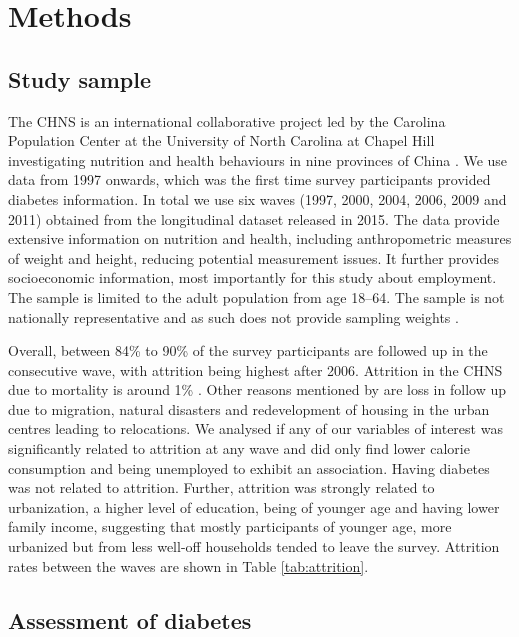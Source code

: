 \section{\label{sec:Methods5}Methods}

\subsection{Study sample}


The \ac{CHNS} is an international collaborative project led by the Carolina Population Center at the University of North Carolina at Chapel Hill investigating nutrition and health behaviours in nine provinces of China \parencite{Zhang2014d}. We use data from 1997 onwards, which was the first time survey participants provided diabetes information. In total we use six waves (1997, 2000, 2004, 2006, 2009 and 2011) obtained from the longitudinal dataset released in 2015. The data provide extensive information on nutrition and health, including anthropometric measures of weight and height, reducing potential measurement issues. It further provides socioeconomic information, most importantly for this study about employment. The sample is limited to the adult population from age 18--64.  The sample is not nationally representative and as such does not provide sampling weights  \parencite{Popkin2010}.

Overall, between 84\% to 90\% of the survey participants are followed up in the consecutive wave, with attrition being highest after 2006. Attrition in the \ac{CHNS} due to mortality is around 1\% \parencite{Popkin2010}. Other reasons mentioned by \textcite{Popkin2010} are loss in follow up due to migration, natural disasters and redevelopment of housing in the urban centres leading to relocations. We analysed if any of our variables of interest was significantly related to attrition at any wave and did only find lower calorie consumption and being unemployed to exhibit an association. Having diabetes was not related to attrition. Further, attrition was strongly related to urbanization, a higher level of education, being of younger age and having lower family income, suggesting that mostly participants of younger age, more urbanized but from less well-off households tended to leave the survey. Attrition rates between the waves are shown in Table \ref{tab:attrition}.


\subsection{Assessment of diabetes}

